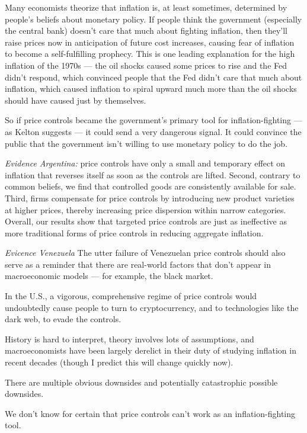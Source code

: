 \documentclass[
]{book}
\begin{document}
Many economists theorize that inflation is, at least sometimes, determined by people's beliefs about monetary policy. If people think the government (especially the central bank) doesn't care that much about fighting inflation, then they'll raise prices now in anticipation of future cost increases, causing fear of inflation to become a self-fulfilling prophecy. This is one leading explanation for the high inflation of the 1970s --- the oil shocks caused some prices to rise and the Fed didn't respond, which convinced people that the Fed didn't care that much about inflation, which caused inflation to spiral upward much more than the oil shocks should have caused just by themselves.

So if price controls became the government's primary tool for inflation-fighting --- as Kelton suggests --- it could send a very dangerous signal.
It could convince the public that the government isn't willing to use monetary policy to do the job.

\emph{Evidence Argentina:}
price controls have only a small and temporary effect on inflation that reverses itself as soon as the controls are lifted. Second, contrary to common beliefs, we find that controlled goods are consistently available for sale. Third, firms compensate for price controls by introducing new product varieties at higher prices, thereby increasing price dispersion within narrow categories. Overall, our results show that targeted price controls are just as ineffective as more traditional forms of price controls in reducing aggregate inflation.

\emph{Evicence Venezuela}
The utter failure of Venezuelan price controls should also serve as a reminder that there are real-world factors that don't appear in macroeconomic models --- for example, the black market.

In the U.S., a vigorous, comprehensive regime of price controls would undoubtedly cause people to turn to cryptocurrency, and to technologies like the dark web, to evade the controls.

History is hard to interpret, theory involves lots of assumptions, and macroeconomists have been largely derelict in their duty of studying inflation in recent decades (though I predict this will change quickly now).

There are multiple obvious downsides and potentially catastrophic possible downsides.

We don't know for certain that price controls can't work as an inflation-fighting tool.
\end{document}
